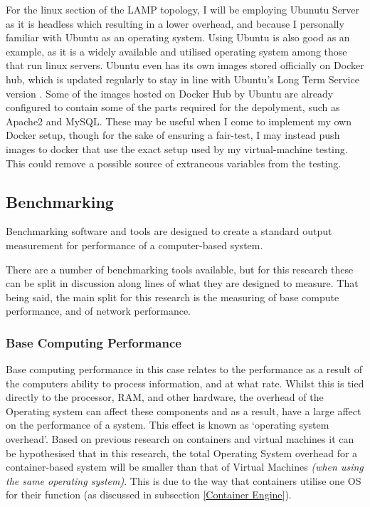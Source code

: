 For the linux section of the LAMP topology, I will be employing Ubunutu Server as it is headless which resulting in a lower overhead, and because I personally familiar with Ubuntu as an operating system. Using Ubuntu is also good as an example, as it is a widely available and utilised operating system among those that run linux servers. Ubuntu even has its own images stored officially on Docker hub, which is updated regularly to stay in line with Ubuntu's Long Term Service version \citep{ubuntuDocker}. Some of the images hosted on Docker Hub by Ubuntu \citep{ubuntuDockerProfile} are already configured to contain some of the parts required for the depolyment, such as Apache2 and MySQL. These may be useful when I come to implement my own Docker setup, though for the sake of ensuring a fair-test, I may instead push images to docker that use the exact setup used by my virtual-machine testing. This could remove a possible source of extraneous variables from the testing.

\subsection{Benchmarking}
\label{sub:Benchmarking}
Benchmarking software and tools are designed to create a standard output measurement for performance of a computer-based system\citep{fleming1986}.

There are a  number of benchmarking tools available, but for this research these can be split in discussion along lines of what they are designed to measure. That being said, the main split for this research is the measuring of base compute performance, and of network performance.

\subsubsection{Base Computing Performance}
Base computing performance in this case relates to the performance as a result of the computers ability to process information, and at what rate. Whilst this is tied directly to the processor, RAM, and other hardware, the overhead of the Operating system can affect these components and as a result, have a large affect on the performance of a system. This effect is known as `operating system overhead'. Based on previous research on containers and virtual machines it can be hypothesised that in this research, the total Operating System overhead for a container-based system will be smaller than that of Virtual Machines \emph{(when using the same operating system)}. This is due to the way that containers utilise one OS for their function (as discussed in subsection \ref{Container Engine}).


